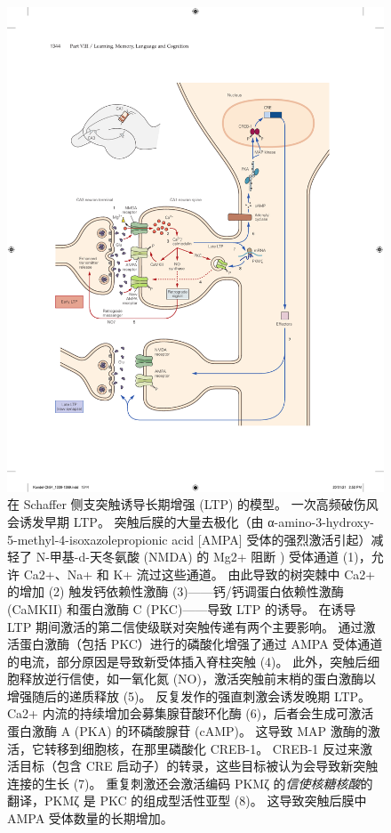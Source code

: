 \begin{figure}[htbp]
	\centering
	\includegraphics[width=0.9\linewidth]{chap54/fig_54_3}
	\caption{在 Schaffer 侧支突触诱导长期增强 (LTP) 的模型。 一次高频破伤风会诱发早期 LTP。 突触后膜的大量去极化（由 α-amino-3-hydroxy-5-methyl-4-isoxazolepropionic acid [AMPA] 受体的强烈激活引起）减轻了 N-甲基-d-天冬氨酸 (NMDA) 的 Mg2+ 阻断 ) 受体通道 (1)，允许 Ca2+、Na+ 和 K+ 流过这些通道。 由此导致的树突棘中 Ca2+ 的增加 (2) 触发钙依赖性激酶 (3)——钙/钙调蛋白依赖性激酶 (CaMKII) 和蛋白激酶 C (PKC)——导致 LTP 的诱导。 在诱导 LTP 期间激活的第二信使级联对突触传递有两个主要影响。 通过激活蛋白激酶（包括 PKC）进行的磷酸化增强了通过 AMPA 受体通道的电流，部分原因是导致新受体插入脊柱突触 (4)。 此外，突触后细胞释放逆行信使，如一氧化氮 (NO)，激活突触前末梢的蛋白激酶以增强随后的递质释放 (5)。 反复发作的强直刺激会诱发晚期 LTP。 Ca2+ 内流的持续增加会募集腺苷酸环化酶 (6)，后者会生成可激活蛋白激酶 A (PKA) 的环磷酸腺苷 (cAMP)。 这导致 MAP 激酶的激活，它转移到细胞核，在那里磷酸化 CREB-1。 CREB-1 反过来激活目标（包含 CRE 启动子）的转录，这些目标被认为会导致新突触连接的生长 (7)。 重复刺激还会激活编码 PKMζ 的\textit{信使核糖核酸}的翻译，PKMζ 是 PKC 的组成型活性亚型 (8)。 这导致突触后膜中 AMPA 受体数量的长期增加。}
	\label{fig:54_3}
\end{figure}



